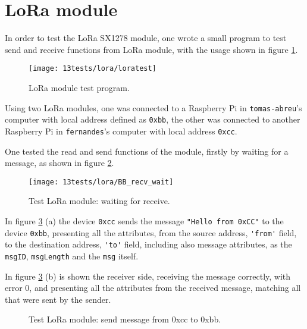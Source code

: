 \section{LoRa module}
In order to test the LoRa SX1278 module, one wrote a small program to test send and receive functions from LoRa module, with the usage shown in figure \ref{fig:loratest}.

\begin{figure}[H]
	\centering	
	\texttt{[image: 13tests/lora/loratest]}
	\caption{LoRa module test program.}
	\label{fig:loratest}
\end{figure}

Using two LoRa modules, one was connected to a Raspberry Pi in\linebreak
\verb|tomas-abreu|'s computer with local address defined as \verb|0xbb|, the other was connected to another Raspberry Pi in \verb|fernandes|'s computer with local address \verb|0xcc|.

One tested the read and send functions of the module, firstly by waiting for a message, as shown in figure \ref{fig:loratest_recv}.

\begin{figure}[H]
	\centering	
	\texttt{[image: 13tests/lora/BB\_recv\_wait]}
	\caption{Test LoRa module: waiting for receive.}
	\label{fig:loratest_recv}
\end{figure}

In figure \ref{fig:loratest_send} (a) the device \verb|0xcc| sends the message \verb|"Hello from 0xCC"| to the device \verb|0xbb|, presenting all the attributes, from the source address, \verb|'from'| field, to the destination address, \verb|'to'| field, including also message attributes, as the \verb|msgID|, \verb|msgLength| and the \verb|msg| itself.

In figure \ref{fig:loratest_send} (b) is shown the receiver side, receiving the message correctly, with error 0, and presenting all the attributes from the received message, matching all that were sent by the sender.

\begin{figure}[H]%
	\centering
	\qquad
	\caption{Test LoRa module: send message from 0xcc to 0xbb.}%
	\label{fig:loratest_send}%
\end{figure}
	
